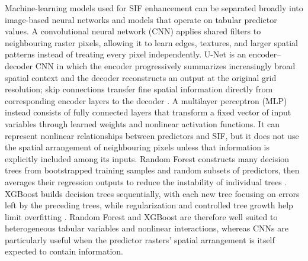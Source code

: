 Machine-learning models used for SIF enhancement can be separated broadly into image-based neural networks and models that operate on tabular predictor values. A convolutional neural network (CNN) applies shared filters to neighbouring raster pixels, allowing it to learn edges, textures, and larger spatial patterns instead of treating every pixel independently. U-Net is an encoder--decoder CNN in which the encoder progressively summarizes increasingly broad spatial context and the decoder reconstructs an output at the original grid resolution; skip connections transfer fine spatial information directly from corresponding encoder layers to the decoder \cite{ronneberger2015u}. A multilayer perceptron (MLP) instead consists of fully connected layers that transform a fixed vector of input variables through learned weights and nonlinear activation functions. It can represent nonlinear relationships between predictors and SIF, but it does not use the spatial arrangement of neighbouring pixels unless that information is explicitly included among its inputs. Random Forest constructs many decision trees from bootstrapped training samples and random subsets of predictors, then averages their regression outputs to reduce the instability of individual trees \cite{breiman2001random}. XGBoost builds decision trees sequentially, with each new tree focusing on errors left by the preceding trees, while regularization and controlled tree growth help limit overfitting \cite{chen2016xgboost}. Random Forest and XGBoost are therefore well suited to heterogeneous tabular variables and nonlinear interactions, whereas CNNs are particularly useful when the predictor rasters' spatial arrangement is itself expected to contain information.

